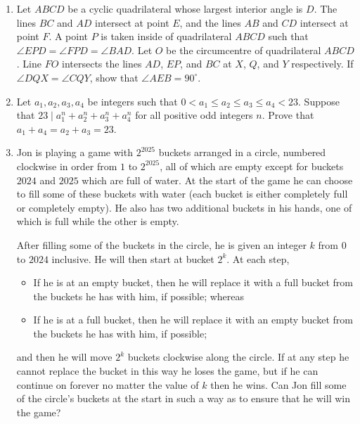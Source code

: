 \documentclass[12pt]{article}
\begin{document}
\begin{enumerate}[topsep=\bigskipamount,itemsep=\bigskipamount]
\item %

Let $ABCD$ be a cyclic quadrilateral whose largest interior angle is $D$. The lines $BC$ and $AD$ intersect at point $E$, and the lines $AB$ and $CD$ intersect at point $F$. A point $P$ is taken inside of quadrilateral $ABCD$ such that $\angle EPD=\angle FPD=\angle BAD$. Let $O$ be the circumcentre of quadrilateral $ABCD$. Line $FO$ intersects the lines $AD$, $EP$, and $BC$ at $X$, $Q$, and $Y$ respectively. If $\angle DQX = \angle CQY$, show that $\angle AEB=90^\circ$.

\item 
Let $a_1, a_2, a_3, a_4$ be integers such that $0 < a_1 \leqslant a_2 \leqslant a_3 \leqslant a_4 < 23$.
Suppose that $23 \mid a_1^n+a_2^n+a_3^n+a_4^n$ for all positive odd integers $n$.
Prove that $a_1+a_4 = a_2+a_3 = 23$.

\item 
Jon is playing a game with $2^{2025}$ buckets arranged in a circle, numbered clockwise in order from $1$ to $2^{2025}$, all of which are empty except for buckets $2024$ and $2025$ which are full of water.
At the start of the game he can choose to fill some of these buckets with water (each bucket is either completely full or completely empty).
He also has two additional buckets in his hands, one of which is full while the other is empty.

After filling some of the buckets in the circle, he is given an integer $k$ from $0$ to $2024$ inclusive. He will then start at bucket $2^k$. At each step,
\begin{itemize}
\item If he is at an empty bucket, then he will replace it with a full bucket from the buckets he has with him, if possible; whereas
\item If he is at a full bucket, then he will replace it with an empty bucket from the buckets he has with him, if possible;
\end{itemize}
and then he will move $2^k$ buckets clockwise along the circle.
If at any step he cannot replace the bucket in this way he loses the game, but if he can continue on forever no matter the value of $k$ then he wins.
Can Jon fill some of the circle's buckets at the start in such a way as to ensure that he will win the game?
\end{enumerate}
\end{document}
